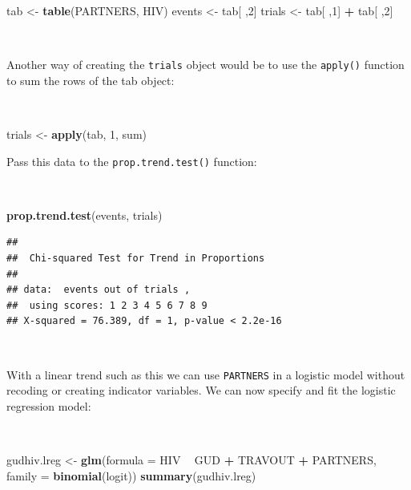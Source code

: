 \documentclass[12pt,a4paper]{book}
\newenvironment{Shaded}{\begin{snugshade}}{\end{snugshade}}
\newcommand{\DataTypeTok}[1]{\textcolor[rgb]{0.13,0.29,0.53}{#1}}
\newcommand{\DecValTok}[1]{\textcolor[rgb]{0.00,0.00,0.81}{#1}}
\newcommand{\KeywordTok}[1]{\textcolor[rgb]{0.13,0.29,0.53}{\textbf{#1}}}
\newcommand{\NormalTok}[1]{#1}
\newcommand{\OperatorTok}[1]{\textcolor[rgb]{0.81,0.36,0.00}{\textbf{#1}}}
\newcommand{\StringTok}[1]{\textcolor[rgb]{0.31,0.60,0.02}{#1}}
\theoremstyle{definition}
\theoremstyle{definition}
\theoremstyle{definition}
\theoremstyle{remark}
\begin{document}
\begin{Shaded}
\begin{Highlighting}[]
\NormalTok{tab <-}\StringTok{ }\KeywordTok{table}\NormalTok{(PARTNERS, HIV)}
\NormalTok{events <-}\StringTok{ }\NormalTok{tab[ ,}\DecValTok{2}\NormalTok{]}
\NormalTok{trials <-}\StringTok{ }\NormalTok{tab[ ,}\DecValTok{1}\NormalTok{] }\OperatorTok{+}\StringTok{ }\NormalTok{tab[ ,}\DecValTok{2}\NormalTok{]}
\end{Highlighting}
\end{Shaded}

~

Another way of creating the \texttt{trials} object would be to use the
\texttt{apply()} function to sum the rows of the tab object:

~

\begin{Shaded}
\begin{Highlighting}[]
\NormalTok{trials <-}\StringTok{ }\KeywordTok{apply}\NormalTok{(tab, }\DecValTok{1}\NormalTok{, sum)}
\end{Highlighting}
\end{Shaded}

\newpage

Pass this data to the \texttt{prop.trend.test()} function:

~

\begin{Shaded}
\begin{Highlighting}[]
\KeywordTok{prop.trend.test}\NormalTok{(events, trials)}
\end{Highlighting}
\end{Shaded}

\begin{verbatim}
## 
##  Chi-squared Test for Trend in Proportions
## 
## data:  events out of trials ,
##  using scores: 1 2 3 4 5 6 7 8 9
## X-squared = 76.389, df = 1, p-value < 2.2e-16
\end{verbatim}

~

With a linear trend such as this we can use \texttt{PARTNERS} in a
logistic model without recoding or creating indicator variables. We can
now specify and fit the logistic regression model:

~

\begin{Shaded}
\begin{Highlighting}[]
\NormalTok{gudhiv.lreg <-}\StringTok{ }\KeywordTok{glm}\NormalTok{(}\DataTypeTok{formula =}\NormalTok{ HIV }\OperatorTok{~}\StringTok{ }\NormalTok{GUD }\OperatorTok{+}\StringTok{ }\NormalTok{TRAVOUT }\OperatorTok{+}\StringTok{ }\NormalTok{PARTNERS,}
                   \DataTypeTok{family =} \KeywordTok{binomial}\NormalTok{(logit))}
\KeywordTok{summary}\NormalTok{(gudhiv.lreg)}
\end{Highlighting}
\end{Shaded}
\end{document}
